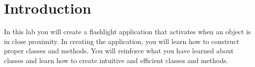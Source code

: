 \section{Introduction}

In this lab you will create a flashlight application that activates when an object is in close proximity. 
In creating the application, you will learn how to construct proper classes and methods. 
You will reinforce what you have learned about classes and learn how to create intuitive and efficient classes and methods.